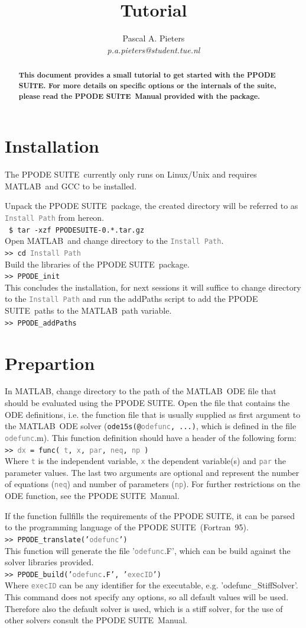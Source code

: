 \documentclass[a4paper,10pt,twocolumn]{article}
\title{\textbf{\PPODESUITE}\\Tutorial}
\author{Pascal A. Pieters\\\small{\textit{p.a.pieters@student.tue.nl}}}
\newcommand{\PPODESUITE}{PPODE SUITE}
\newcommand{\MATLAB}{MATLAB}
\newcommand{\Fortran}{Fortran}
\newcommand{\shellcmd}[1]{\\\indent~\texttt{\footnotesize \$ #1}\\}
\newcommand{\matlabcmd}[1]{\\\indent\texttt{\footnotesize >> #1}\\}
\newcommand{\matlabcmdinline}[1]{\textacutedbl\texttt{\footnotesize#1}\textgravedbl}
\newcommand{\ph}[1]{\texttt{\footnotesize \textcolor{gray}{\textlangle #1\textrangle}}}
\begin{document}
\maketitle

\begin{abstract}
\textbf{This document provides a small tutorial to get started with the \PPODESUITE. For more details on specific options or the internals of the suite, please read the \PPODESUITE~Manual provided with the package.}
\end{abstract}

\section{Installation}
The \PPODESUITE~currently only runs on Linux/Unix and requires \MATLAB~and GCC to be installed.

Unpack the \PPODESUITE~package, the created directory will be referred to as \ph{Install Path} from hereon.
\shellcmd{tar -xzf PPODESUITE-0.*.tar.gz}
Open \MATLAB~and change directory to the \ph{Install Path}.
\matlabcmd{cd \ph{Install Path}}
Build the libraries of the \PPODESUITE~package.
\matlabcmd{PPODE\_init}
This concludes the installation, for next sessions it will suffice to change directory to the \ph{Install Path} and run the addPaths script to add the \PPODESUITE~paths to the \MATLAB~path variable.
\matlabcmd{PPODE\_addPaths}

\section{Prepartion}
In \MATLAB, change directory to the path of the \MATLAB~ODE file that should be evaluated using the \PPODESUITE. Open the file that contains the ODE definitions, i.e. the function file that is usually supplied as first argument to the \MATLAB~ODE solver (\matlabcmdinline{ode15s(@\ph{odefunc}, ...)}, which is defined in the file \ph{odefunc}.m). This function definition should have a header of the following form:
\matlabcmd{\ph{dx} = func( \ph{t}, \ph{x}, \ph{par}, \ph{neq}, \ph{np} )}
Where \ph{t} is the independent variable, \ph{x} the dependent variable(s) and \ph{par} the parameter values. The last two arguments are optional and represent the number of equations (\ph{neq}) and number of parameters (\ph{np}). For further restrictions on the ODE function, see the \PPODESUITE~Manual.

If the function fullfills the requirements of the \PPODESUITE, it can be parsed to the programming language of the \PPODESUITE~(\Fortran~95).
\matlabcmd{PPODE\_translate('\ph{odefunc}')}
This function will generate the file '\ph{odefunc}.F', which can be build against the solver libraries provided.
\matlabcmd{PPODE\_build('\ph{odefunc}.F', '\ph{execID}')}
Where \ph{execID} can be any identifier for the executable, e.g. 'odefunc\_StiffSolver'. This command does not specify any options, so all default values will be used. Therefore also the default solver is used, which is a stiff solver, for the use of other solvers consult the \PPODESUITE~Manual.
\end{document}
